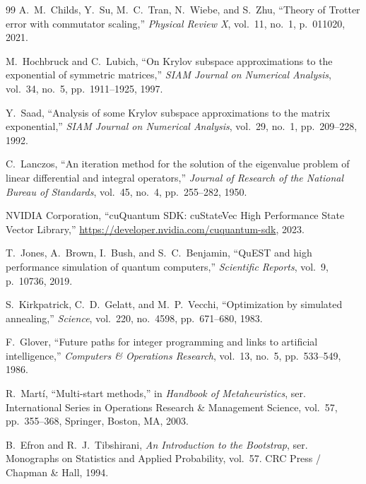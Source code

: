 \begin{thebibliography}{99}
A.~M.~Childs, Y.~Su, M.~C.~Tran, N.~Wiebe, and S.~Zhu,
``Theory of Trotter error with commutator scaling,''
\emph{Physical Review X}, vol.~11, no.~1, p.~011020, 2021.

M.~Hochbruck and C.~Lubich,
``On Krylov subspace approximations to the exponential of symmetric matrices,''
\emph{SIAM Journal on Numerical Analysis}, vol.~34, no.~5, pp.~1911--1925, 1997.

Y.~Saad,
``Analysis of some Krylov subspace approximations to the matrix exponential,''
\emph{SIAM Journal on Numerical Analysis}, vol.~29, no.~1, pp.~209--228, 1992.

C.~Lanczos,
``An iteration method for the solution of the eigenvalue problem of linear differential and integral operators,''
\emph{Journal of Research of the National Bureau of Standards}, vol.~45, no.~4, pp.~255--282, 1950.

{NVIDIA Corporation},
``cuQuantum SDK: cuStateVec High Performance State Vector Library,''
\url{https://developer.nvidia.com/cuquantum-sdk}, 2023.

T.~Jones, A.~Brown, I.~Bush, and S.~C.~Benjamin,
``QuEST and high performance simulation of quantum computers,''
\emph{Scientific Reports}, vol.~9, p.~10736, 2019.

S.~Kirkpatrick, C.~D.~Gelatt, and M.~P.~Vecchi,
``Optimization by simulated annealing,''
\emph{Science}, vol.~220, no.~4598, pp.~671--680, 1983.

F.~Glover,
``Future paths for integer programming and links to artificial intelligence,''
\emph{Computers \& Operations Research}, vol.~13, no.~5, pp.~533--549, 1986.

R.~Mart{\'i},
``Multi-start methods,''
in \emph{Handbook of Metaheuristics}, ser. International Series in Operations Research \& Management Science, vol.~57, pp.~355--368, Springer, Boston, MA, 2003.

B.~Efron and R.~J.~Tibshirani,
\emph{An Introduction to the Bootstrap},
ser. Monographs on Statistics and Applied Probability, vol.~57. CRC Press / Chapman \& Hall, 1994.

\end{thebibliography}
